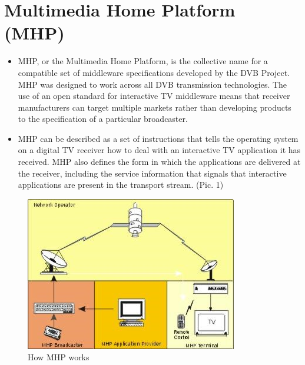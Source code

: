 \documentclass[english]{article}
\begin{document}
\section{Multimedia Home Platform (MHP)}
\begin{itemize}
 \item MHP, or the Multimedia Home Platform, is the collective name for a compatible set of middleware specifications developed by the DVB Project. MHP was designed to work across all DVB transmission technologies. The use of an open standard for interactive TV middleware means that receiver manufacturers can target multiple markets rather than developing products to the specification of a particular broadcaster.
 \item MHP can be described as a set of instructions that tells the operating system on a digital TV receiver how to deal with an interactive TV application it has received. MHP also defines the form in which the applications are delivered at the receiver, including the service information that signals that interactive applications are present in the transport stream. (Pic. 1)
\end{itemize}
\begin{figure}
\centerline{\includegraphics[scale=1]{DTV/Pic1}}
\caption{How MHP works}
\end{figure}
\end{document}
